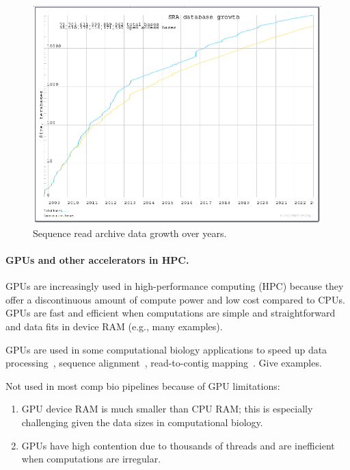 \setlength\intextsep{0pt}
\begin{figure}
\centering
\includegraphics[width=4.4in]{proposal/images/SRA_data_growth.png}
\caption{Sequence read archive data growth over years.}
\label{fig1}
\end{figure}


\paragraph{GPUs and other accelerators in HPC.} 
GPUs are increasingly used in high-performance computing (HPC) because they offer a discontinuous amount of compute power and low cost compared to CPUs. 
GPUs are fast and efficient when computations are simple and straightforward and data fits in device RAM (e.g., many examples).

GPUs are used in some computational biology  applications to speed up data processing~\cite{xxx}, sequence alignment~\cite{xxx}, read-to-contig mapping~\cite{xxx}.
Give examples.

Not used in most comp bio pipelines because of GPU limitations:
\begin{enumerate}
  \item GPU device RAM is much smaller than CPU RAM; this is especially
    challenging given the data sizes in computational biology.
  \item GPUs have high contention due to thousands of threads and are
    inefficient when computations are irregular.
\end{enumerate}

